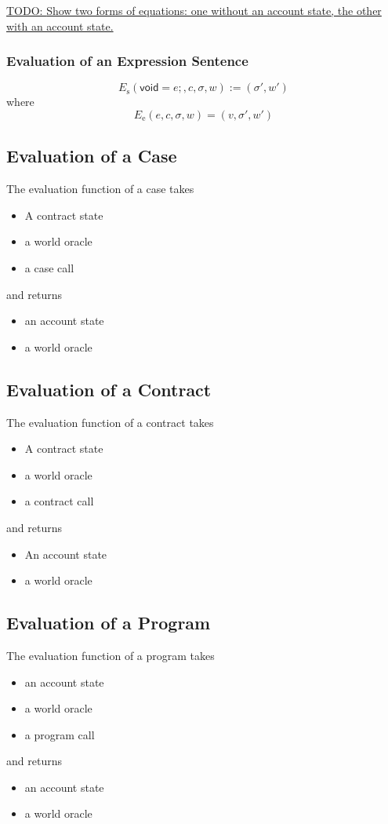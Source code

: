 \documentclass{book}
\newcommand{\todo}[1]{\underline{TODO: {#1}}}
\newcommand{\evalE}[1]{E_\mathrm{e}\left({#1}\right)}
\newcommand{\evalS}[1]{E_\mathrm{s}\left({#1}\right)}
\newcommand{\expressionsentence}[1]{\mathsf{void}={#1}\mathsf{;}}
\begin{document}
\todo{Show two forms of equations: one without an account state, the other with an account state.}

\subsubsection{Evaluation of an Expression Sentence}

\[
\evalS{\boxed{\expressionsentence{e}}, c, \sigma, w} := (\sigma', w')
\]
where
\[
\evalE{\boxed{e}, c, \sigma, w} = (v, \sigma', w')
\]

\subsection{Evaluation of a Case}

The evaluation function of a case takes
\begin{itemize}
\item A contract state
\item a world oracle
\item a case call
\end{itemize}
and returns
\begin{itemize}
\item an account state
\item a world oracle
\end{itemize}

\subsection{Evaluation of a Contract}

The evaluation function of a contract takes
\begin{itemize}
\item A contract state
\item a world oracle
\item a contract call
\end{itemize}
and returns
\begin{itemize}
\item An account state
\item a world oracle
\end{itemize}

\subsection{Evaluation of a Program}

The evaluation function of a program takes
\begin{itemize}
\item an account state
\item a world oracle
\item a program call
\end{itemize}
and returns
\begin{itemize}
\item an account state
\item a world oracle
\end{itemize}
\end{document}
